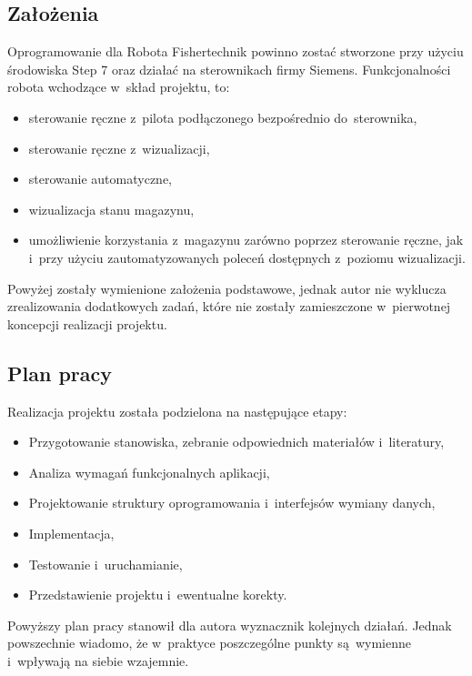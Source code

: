 \subsection{Założenia}
Oprogramowanie dla Robota Fishertechnik powinno zostać stworzone przy użyciu środowiska Step 7 oraz działać na sterownikach firmy Siemens. Funkcjonalności robota wchodzące w~skład projektu, to:
\begin{itemize}
\item sterowanie ręczne z~pilota podłączonego bezpośrednio do~sterownika,
\item sterowanie ręczne z~wizualizacji,
\item sterowanie automatyczne, 
\item wizualizacja stanu magazynu,
\item umożliwienie korzystania z~magazynu zarówno poprzez sterowanie ręczne, jak i~przy użyciu zautomatyzowanych poleceń dostępnych z~poziomu wizualizacji.
\end{itemize}
\indent
\indent Powyżej zostały wymienione założenia podstawowe, jednak autor nie wyklucza zrealizowania dodatkowych zadań, które nie zostały zamieszczone w~pierwotnej koncepcji realizacji projektu.

\subsection{Plan pracy}
Realizacja projektu została podzielona na następujące etapy:
\begin{itemize}
\item Przygotowanie stanowiska, zebranie odpowiednich materiałów i~literatury,
\item Analiza wymagań funkcjonalnych aplikacji,
\item Projektowanie struktury oprogramowania i~interfejsów wymiany danych,
\item Implementacja,
\item Testowanie i~uruchamianie,
\item Przedstawienie projektu i~ewentualne korekty.
\end{itemize}
\indent
\indent Powyższy plan pracy stanowił dla autora wyznacznik kolejnych działań. Jednak powszechnie wiadomo, że w~praktyce poszczególne punkty są~wymienne i~wpływają na siebie wzajemnie.

